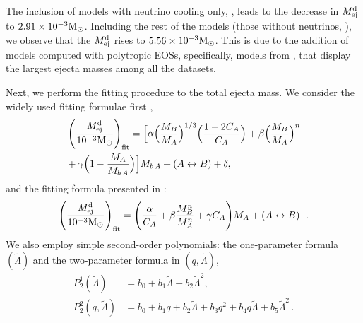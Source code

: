 The inclusion of models with neutrino cooling only, \DScool{}, 
leads to the decrease in $M^{\text{d}}_{\text{ej}}$ to $2.91\times 10^{-3}{\text{M}_{\odot}}{}$.
%
Including the rest of the models (those without neutrinos, \DSnone{}), we observe 
that the $M^{\text{d}}_{\text{ej}}$ rises to $5.56\times 10^{-3}{\text{M}_{\odot}}{}$. This is due to the addition 
of models computed with polytropic \acp{EOS}, specifically, models from 
\citet{Dietrich:2016hky}, that display the largest ejecta masses among all the datasets.
%


Next, we perform the fitting procedure to the total ejecta mass. 
We consider the widely used fitting formulae first 
\citep{Kawaguchi:2016ana,Dietrich:2016fpt,Radice:2018pdn}, 
%
\begin{eqnarray}
\label{eq:fit_Mej}
&\left(\frac{M^{\text{d}}_{\text{ej}}}{10^{-3}{\text{M}_{\odot}}{}}\right)_{\rm fit} =
\Big[\alpha\Big(\frac{M_B}{M_A}\Big)^{1/3}\Big(\frac{1-2C_A}{C_A}\Big)+  
\beta\Big(\frac{M_B}{M_A}\Big)^n \\
&+ \gamma\Big(1-\frac{M_A}{M_{b\,A}} \Big)\Big]M_{b\,A} + (A\leftrightarrow B) + \delta\nonumber,
\end{eqnarray}
%
and the fitting formula presented in \citet{Kruger:2020gig}:
%
\begin{equation}
\label{eq:fit_Mej_Kruger}
\left(\frac{M^{\text{d}}_{\text{ej}}}{10^{-3}{\text{M}_{\odot}}{}}\right)_{\rm fit} =
\left(\frac{\alpha}{C_A} + \beta\frac{M_B ^n}{M_A ^n} + \gamma
C_A\Bigg)M_A + (A\leftrightarrow B)\right. \ .
\end{equation}
%
We also employ simple second-order polynomials: 
the one-parameter formula $(\tilde\Lambda)$ and the two-parameter
formula in $(q,\tilde\Lambda)$, 
%
\begin{align}\label{eq:polyfit2}
P_2 ^1(\tilde{\Lambda}) &= b_0 + b_1\tilde\Lambda + b_2 \tilde\Lambda^2, \\\label{eq:polyfit22}
P_2 ^2(q,\tilde\Lambda) &= b_0 + b_1q + b_2\tilde\Lambda + b_3q ^2 +  b_4 q \tilde\Lambda + b_5\tilde\Lambda^2 \, .
\end{align}

%

